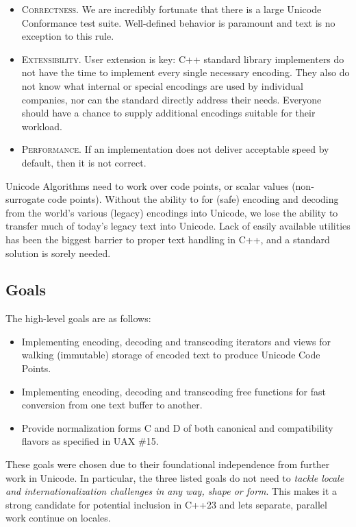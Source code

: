 \documentclass{wg21}
\begin{document}
\begin{itemize}
	\item \textsc{Correctness}. We are incredibly fortunate that there is a large Unicode Conformance test suite. Well-defined behavior is paramount and text is no exception to this rule.
	\item \textsc{Extensibility}. User extension is key: C++ standard library implementers do not have the time to implement every single necessary encoding. They also do not know what internal or special encodings are used by individual companies, nor can the standard directly address their needs. Everyone should have a chance to supply additional encodings suitable for their workload.
	\item \textsc{Performance}. If an implementation does not deliver acceptable speed by default, then it is not correct.
\end{itemize}

Unicode Algorithms need to work over code points, or scalar values (non-surrogate code points). Without the ability to for (safe) encoding and decoding from the world's various (legacy) encodings into Unicode, we lose the ability to transfer much of today's legacy text into Unicode. Lack of easily available utilities has been the biggest barrier to proper text handling in C++, and a standard solution is sorely needed.

\pagebreak


\subsection[goals]{Goals}

The high-level goals are as follows:

\begin{itemize}
	\item Implementing encoding, decoding and transcoding iterators and views for walking (immutable) storage of encoded text to produce Unicode Code Points.
	\item Implementing encoding, decoding and transcoding free functions for fast conversion from one text buffer to another.
	\item Provide normalization forms C and D of both canonical and compatibility flavors as specified in UAX \#15\cite{uax_15}.
\end{itemize}

These goals were chosen due to their foundational independence from further work in Unicode. In particular, the three listed goals do not need to \emph{tackle locale and internationalization challenges in any way, shape or form}. This makes it a strong candidate for potential inclusion in C++23 and lets separate, parallel work continue on locales.
\end{document}
